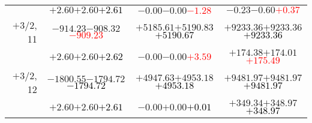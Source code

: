 \documentclass[compress]{beamer}
\begin{document}
\begin{frame}
{\begin{tabular}{r | c | c | c}
           & $+2.60$\hspace{0.1 cm}$+2.60$\hspace{0.1 cm}\textcolor{black}{$+2.61$} & $-0.00$\hspace{0.1 cm}$-0.00$\hspace{0.1 cm}\textcolor{red}{$-1.28$} & $-0.23$\hspace{0.1 cm}$-0.60$\hspace{0.1 cm}\textcolor{red}{$+0.37$} \\
$+$3/2, 11 & $-914.23$\hspace{0.1 cm}$-908.32$\hspace{0.1 cm}\textcolor{red}{$-909.23$} & $+5185.61$\hspace{0.1 cm}$+5190.83$\hspace{0.1 cm}\textcolor{black}{$+5190.67$} & $+9233.36$\hspace{0.1 cm}$+9233.36$\hspace{0.1 cm}\textcolor{black}{$+9233.36$} \\
           & $+2.60$\hspace{0.1 cm}$+2.60$\hspace{0.1 cm}\textcolor{black}{$+2.62$} & $-0.00$\hspace{0.1 cm}$-0.00$\hspace{0.1 cm}\textcolor{red}{$+3.59$} & $+174.38$\hspace{0.1 cm}$+174.01$\hspace{0.1 cm}\textcolor{red}{$+175.49$} \\
$+$3/2, 12 & $-1800.55$\hspace{0.1 cm}$-1794.72$\hspace{0.1 cm}\textcolor{black}{$-1794.72$} & $+4947.63$\hspace{0.1 cm}$+4953.18$\hspace{0.1 cm}\textcolor{black}{$+4953.18$} & $+9481.97$\hspace{0.1 cm}$+9481.97$\hspace{0.1 cm}\textcolor{black}{$+9481.97$} \\
           & $+2.60$\hspace{0.1 cm}$+2.60$\hspace{0.1 cm}\textcolor{black}{$+2.61$} & $-0.00$\hspace{0.1 cm}$+0.00$\hspace{0.1 cm}\textcolor{black}{$+0.01$} & $+349.34$\hspace{0.1 cm}$+348.97$\hspace{0.1 cm}\textcolor{black}{$+348.97$} \\
\end{tabular}}
\end{frame}
\end{document}
